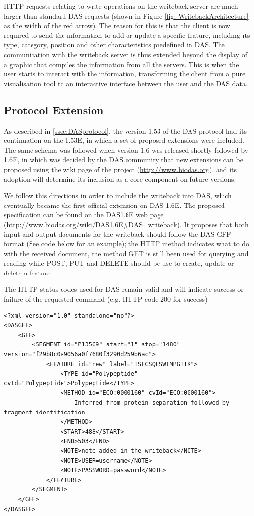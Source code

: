 HTTP requests relating to write operations on the writeback server are much larger than standard DAS requests (shown in Figure \ref{fig: WritebackArchitecture} as the width of the red arrow). The reason for this is that the client is now required to send the information to add or update a specific feature, including its type, category, position and other characteristics predefined in DAS. The communication with the writeback server is thus extended beyond the display of a graphic that compiles the information from all the servers. This is when the user starts to interact with the information, transforming the client from a pure visualisation tool to an interactive interface between the user and the DAS data.





\subsection{Protocol Extension}
As described in \ref{ssec:DASprotocol}, the version 1.53 of the DAS protocol had its continuation on the 1.53E, in which a set of proposed extensions were included. The same schema was followed when version 1.6 was released shortly followed by 1.6E, in which was decided by the DAS community that new extensions can be proposed using the wiki page of the project (\url{http://www.biodas.org}), and its adoption will determine its inclusion as a core component on future versions.

We follow this directions in order to include the writeback into DAS, which eventually became the first official extension on DAS 1.6E. The proposed specification can be found on the DAS1.6E web page (\url{http://www.biodas.org/wiki/DAS1.6E\#DAS\_writeback}). It proposes that both input and output documents for the writeback should follow the DAS GFF format (See code below for an example); the HTTP method indicates what to do with the received document, the method GET is still been used for querying and reading while POST, PUT and DELETE should be use to create, update or delete a feature.

The HTTP status codes used for DAS remain valid and will indicate success or failure of the requested command (e.g. HTTP code 200 for success)

\begin{lstlisting}
<?xml version="1.0" standalone="no"?>
<DASGFF>
	<GFF>
		<SEGMENT id="P13569" start="1" stop="1480" version="f29b8c0a9056a0f7680f3290d259b6ac">
			<FEATURE id="new" label="ISFCSQFSWIMPGTIK">
				<TYPE id="Polypeptide" cvId="Polypeptide">Polypeptide</TYPE>
				<METHOD id="ECO:0000160" cvId="ECO:0000160">
					Inferred from protein separation followed by fragment identification
				</METHOD>
				<START>488</START>
				<END>503</END>
				<NOTE>note added in the writeback</NOTE>
				<NOTE>USER=username</NOTE>
				<NOTE>PASSWORD=password</NOTE>
			</FEATURE>
		</SEGMENT>
	</GFF>
</DASGFF>
\end{lstlisting}



